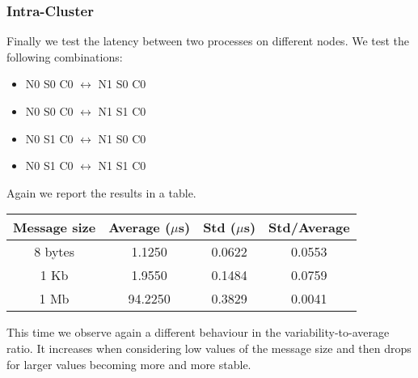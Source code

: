 \subsubsection{Intra-Cluster}
    Finally we test the latency between two processes on different nodes.
    We test the following combinations:
    \begin{itemize}
        \item N0 S0 C0 $\leftrightarrow$ N1 S0 C0
        \item N0 S0 C0 $\leftrightarrow$ N1 S1 C0
        \item N0 S1 C0 $\leftrightarrow$ N1 S0 C0
        \item N0 S1 C0 $\leftrightarrow$ N1 S1 C0
    \end{itemize}
    Again we report the results in a table.
    \begin{table}[H]
        \centering
        \begin{tabular}{|c|c|c|c|}
            \hline
            \textbf{Message size} & \textbf{Average ($\mu$s)} & \textbf{Std ($\mu$s)} & \textbf{Std/Average} \\
            \hline
            8 bytes & 1.1250 & 0.0622 & 0.0553 \\
            1 Kb & 1.9550 & 0.1484 & 0.0759 \\
            1 Mb & 94.2250 & 0.3829 & 0.0041 \\
            \hline
        \end{tabular}
    \end{table}
    This time we observe again a different behaviour in the variability-to-average
    ratio. It increases when considering low values of the message size and
    then drops for larger values becoming more and more stable.

